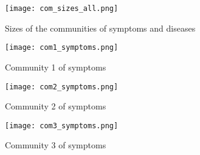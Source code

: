 \begin{figure}[H]
    \centering
    \texttt{[image: com\_sizes\_all.png]}
    \caption{Sizes of the communities of symptoms and diseases}
    \label{fig:com_sizes_all}
\end{figure}

\begin{figure}[H]
    \centering
    \texttt{[image: com1\_symptoms.png]}
    \caption{Community 1 of symptoms}
    \label{fig:com1_symptoms}
\end{figure}

\begin{figure}[H]
    \centering
    \texttt{[image: com2\_symptoms.png]}
    \caption{Community 2 of symptoms}
    \label{fig:com2_symptoms}
\end{figure}

\begin{figure}[H]
    \centering
    \texttt{[image: com3\_symptoms.png]}
    \caption{Community 3 of symptoms}
    \label{fig:com3_symptoms}
\end{figure}




